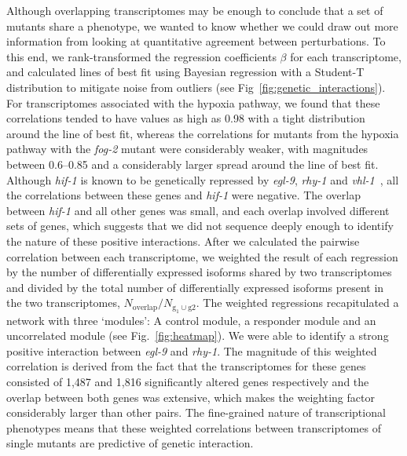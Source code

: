 \documentclass[9pt,twocolumn,twoside]{pnas-new}
\newcommand{\egl}{\emph{egl-9}}
\newcommand{\rhy}{\emph{rhy-1}}
\newcommand{\vhl}{\emph{vhl-1}}
\newcommand{\hif}{\emph{hif-1}}
\newcommand{\fog}{\emph{fog-2}}
\newcommand{\egln}{1,487}
\newcommand{\rhyn}{1,816}
\begin{document}
Although overlapping transcriptomes may be enough to conclude that a set of mutants
share a phenotype, we wanted to know whether we could draw out more information from
looking at quantitative agreement between perturbations. To this end, we rank-transformed
the regression coefficients $\beta$ for each transcriptome, and calculated lines
of best fit using Bayesian regression with a Student-T distribution to mitigate
noise from outliers (see Fig~\ref{fig:genetic_interactions}). For transcriptomes
associated with the hypoxia pathway, we found that these correlations tended to have
values as high as 0.98 with a tight distribution around the line of best fit,
whereas the correlations for mutants from the hypoxia pathway
with the \fog{} mutant were considerably weaker, with magnitudes between
0.6--0.85 and a considerably larger spread around the line of best fit.
Although \hif{} is known to be genetically repressed by \egl{}, \rhy{} and
\vhl{}~\cite{}, all the correlations between these genes and \hif{} were
negative. The overlap between
\hif{} and all other genes was small, and each overlap involved
different sets of genes, which suggests that we did not sequence deeply enough
to identify the nature of these positive interactions.
After we calculated the pairwise correlation between each transcriptome,
we weighted the result of each regression by the
number of differentially expressed isoforms shared by two transcriptomes and
divided by the total number of differentially expressed isoforms present in the
two transcriptomes, $N_\mathrm{overlap}/N_{\mathrm{g_1} \cup \mathrm{g2}}$.
The weighted regressions recapitulated a network with three `modules': A control
module, a responder module and an uncorrelated module (see Fig.~\ref{fig:heatmap}).
We were able to identify a strong positive interaction between \egl{} and \rhy{}.
The magnitude of this weighted correlation is derived from the fact that the
transcriptomes for these genes consisted of \egln{} and \rhyn{} significantly
altered genes respectively and the overlap between both genes was
extensive, which makes the weighting factor considerably larger than other pairs.
The fine-grained nature of transcriptional phenotypes means that these weighted
correlations between transcriptomes of single mutants are predictive of genetic
interaction.
\end{document}
